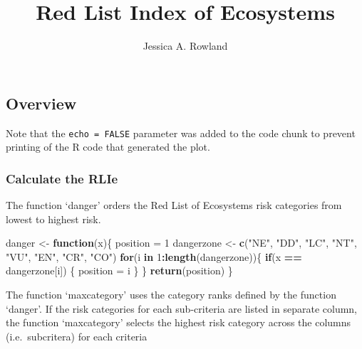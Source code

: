 \documentclass[]{article}
\title{Red List Index of Ecosystems}
\author{Jessica A. Rowland}
\date{}
\newenvironment{Shaded}{\begin{snugshade}}{\end{snugshade}}
\newcommand{\KeywordTok}[1]{\textcolor[rgb]{0.13,0.29,0.53}{\textbf{#1}}}
\newcommand{\DecValTok}[1]{\textcolor[rgb]{0.00,0.00,0.81}{#1}}
\newcommand{\StringTok}[1]{\textcolor[rgb]{0.31,0.60,0.02}{#1}}
\newcommand{\ControlFlowTok}[1]{\textcolor[rgb]{0.13,0.29,0.53}{\textbf{#1}}}
\newcommand{\OperatorTok}[1]{\textcolor[rgb]{0.81,0.36,0.00}{\textbf{#1}}}
\newcommand{\NormalTok}[1]{#1}
\begin{document}
\maketitle

\subsection{Overview}\label{overview}

Note that the \texttt{echo\ =\ FALSE} parameter was added to the code
chunk to prevent printing of the R code that generated the plot.

\subsubsection{Calculate the RLIe}\label{calculate-the-rlie}

The function `danger' orders the Red List of Ecosystems risk categories
from lowest to highest risk.

\begin{Shaded}
\begin{Highlighting}[]
\NormalTok{danger <-}\StringTok{ }\ControlFlowTok{function}\NormalTok{(x)\{}
\NormalTok{  position =}\StringTok{ }\DecValTok{1}
\NormalTok{  dangerzone <-}\StringTok{ }\KeywordTok{c}\NormalTok{(}\StringTok{"NE"}\NormalTok{, }\StringTok{"DD"}\NormalTok{, }\StringTok{"LC"}\NormalTok{, }\StringTok{"NT"}\NormalTok{, }\StringTok{"VU"}\NormalTok{, }\StringTok{"EN"}\NormalTok{, }\StringTok{"CR"}\NormalTok{, }\StringTok{"CO"}\NormalTok{)}
  \ControlFlowTok{for}\NormalTok{(i }\ControlFlowTok{in} \DecValTok{1}\OperatorTok{:}\KeywordTok{length}\NormalTok{(dangerzone))\{}
    \ControlFlowTok{if}\NormalTok{(x }\OperatorTok{==}\StringTok{ }\NormalTok{dangerzone[i]) \{}
\NormalTok{      position =}\StringTok{ }\NormalTok{i}
\NormalTok{    \}}
\NormalTok{  \}}
    \KeywordTok{return}\NormalTok{(position)}
\NormalTok{\}}
\end{Highlighting}
\end{Shaded}

The function `maxcategory' uses the category ranks defined by the
function `danger'. If the risk categories for each sub-criteria are
listed in separate column, the function `maxcategory' selects the
highest risk category across the columns (i.e.~subcritera) for each
criteria
\end{document}
